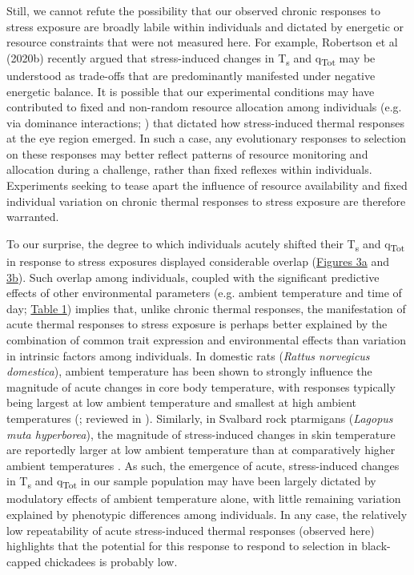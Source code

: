 \documentclass[12pt]{article}
\begin{document}
\noindent Still, we cannot refute the possibility that our observed chronic responses to stress exposure are broadly labile within individuals and dictated by energetic or resource constraints that were not measured here. For example, Robertson et al (2020b) recently argued that stress-induced changes in T\textsubscript{s} and q\textsubscript{Tot} may be understood as trade-offs that are predominantly manifested under negative energetic balance. It is possible that our experimental conditions may have contributed to fixed and non-random resource allocation among individuals (e.g. via dominance interactions; \citealt{ratcliffe_2007}) that dictated how stress-induced thermal responses at the eye region emerged. In such a case, any evolutionary responses to selection on these responses may better reflect patterns of resource monitoring and allocation during a challenge, rather than fixed reflexes within individuals. Experiments seeking to tease apart the influence of resource availability and fixed individual variation on chronic thermal responses to stress exposure are therefore warranted. \vspace{1cm}

\noindent To our surprise, the degree to which individuals acutely shifted their T\textsubscript{s} and q\textsubscript{Tot} in response to stress exposures displayed considerable overlap (\hyperref[Fig4.3]{Figures 3a} and \hyperref[Fig4.3]{3b}). Such overlap among individuals, coupled with the significant predictive effects of other environmental parameters (e.g. ambient temperature and time of day; \hyperref[Tab4.1]{Table 1}) implies that, unlike chronic thermal responses, the manifestation of acute thermal responses to stress exposure is perhaps better explained by the combination of common trait expression and environmental effects than variation in intrinsic factors among individuals. In domestic rats (\textit{Rattus norvegicus domestica}), ambient temperature has been shown to strongly influence the magnitude of acute changes in core body temperature, with responses typically being largest at low ambient temperature and smallest at high ambient temperatures (\citealt{briese_1992}; reviewed in \citealt{oka_2018}). Similarly, in Svalbard rock ptarmigans (\textit{Lagopus muta hyperborea}), the magnitude of stress-induced changes in skin temperature are reportedly larger at low ambient temperature than at comparatively higher ambient temperatures \citep{nord_2019b}. As such, the emergence of acute, stress-induced changes in T\textsubscript{s} and q\textsubscript{Tot} in our sample population may have been largely dictated by modulatory effects of ambient temperature alone, with little remaining variation explained by phenotypic differences among individuals. In any case, the relatively low repeatability of acute stress-induced thermal responses (observed here) highlights that the potential for this response to respond to selection in black-capped chickadees is probably low.\vspace{0.5cm}
\end{document}
